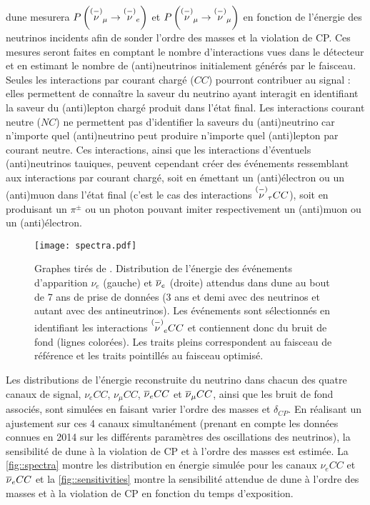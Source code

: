         \gls{dune} mesurera $P\left(\overset{(-)}{\nu}_{\mu}\to\overset{(-)}{\nu}_e\right)$ et $P\left(\overset{(-)}{\nu}_{\mu}\to\overset{(-)}{\nu}_{\mu}\right)$ en fonction de l'énergie des neutrinos incidents afin de sonder l'ordre des masses et la violation de CP. Ces mesures seront faites en comptant le nombre d'interactions vues dans le détecteur et en estimant le nombre de (anti)neutrinos initialement générés par le faisceau. Seules les interactions par courant chargé ($CC$) pourront contribuer au signal : elles permettent de connaître la saveur du neutrino ayant interagit en identifiant la saveur du (anti)lepton chargé produit dans l'état final. Les interactions courant neutre ($NC$) ne permettent pas d'identifier la saveurs du (anti)neutrino car n'importe quel (anti)neutrino peut produire n'importe quel (anti)lepton par courant neutre. Ces interactions, ainsi que les interactions d'éventuels (anti)neutrinos tauiques, peuvent cependant créer des événements ressemblant aux interactions par courant chargé, soit en émettant un (anti)électron ou un (anti)muon dans l'état final (c'est le cas des interactions $\overset{(-)}{\nu}_{\tau} CC$), soit en produisant un $\pi^{\pm}$ ou un photon pouvant imiter respectivement un (anti)muon ou un (anti)électron.

        \begin{figure}[htbp]
          \texttt{[image: spectra.pdf]}
          \caption[Distribution de l'énergie des événements attendus dans \acrshort{dune}]{\label{fig::spectra}Graphes tirés de \cite{Collaboration2015}. Distribution de l'énergie des événements d'apparition $\nu_e$ (gauche) et $\overline{\nu}_e$ (droite) attendus dans \acrshort{dune} au bout de 7 ans de prise de données (3 ans et demi avec des neutrinos et autant avec des antineutrinos). Les événements sont sélectionnés en identifiant les interactions $\overset{(-)}{\nu}_e CC$ et contiennent donc du bruit de fond (lignes colorées). Les traits pleins correspondent au faisceau de référence et les traits pointillés au faisceau optimisé.}
        \end{figure}

        Les distributions de l'énergie reconstruite du neutrino dans chacun des quatre canaux de signal, $\nu_e CC$, $\nu_{\mu} CC$, $\overline{\nu}_e CC$ et $\overline{\nu}_{\mu} CC$, ainsi que les bruit de fond associés, sont simulées en faisant varier l'ordre des masses et $\delta_{CP}$. En réalisant un ajustement sur ces 4 canaux simultanément (prenant en compte les données connues en 2014 sur les différents paramètres des oscillations des neutrinos), la sensibilité de \gls{dune} à la violation de CP et à l'ordre des masses est estimée. La \autoref{fig::spectra} montre les distribution en énergie simulée pour les canaux $\nu_e CC$ et $\overline{\nu}_e CC$ et la \autoref{fig::sensitivities} montre la sensibilité attendue de \gls{dune} à l'ordre des masses et à la violation de CP en fonction du temps d'exposition.

